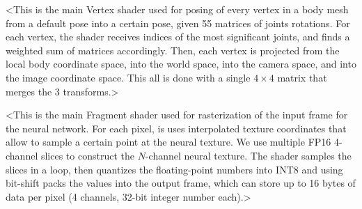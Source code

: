 <This is the main Vertex shader used for posing of every vertex in a body mesh from a default pose into a certain pose, given 55 matrices of joints rotations. For each vertex, the shader receives indices of the most significant joints, and finds a weighted sum of matrices accordingly. Then, each vertex is projected from the local body coordinate space, into the world space, into the camera space, and into the image coordinate space. This all is done with a single $4\times4$ matrix that merges the 3 transforms.>

<This is the main Fragment shader used for rasterization of the input frame for the neural network. For each pixel, is uses interpolated texture coordinates that allow to sample a certain point at the neural texture. We use multiple FP16 4-channel slices to construct the $N$-channel neural texture. The shader samples the slices in a loop, then quantizes the floating-point numbers into INT8 and using bit-shift packs the values into the output frame, which can store up to 16 bytes of data per pixel (4 channels, 32-bit integer number each).>


\clearpage
\newpage
